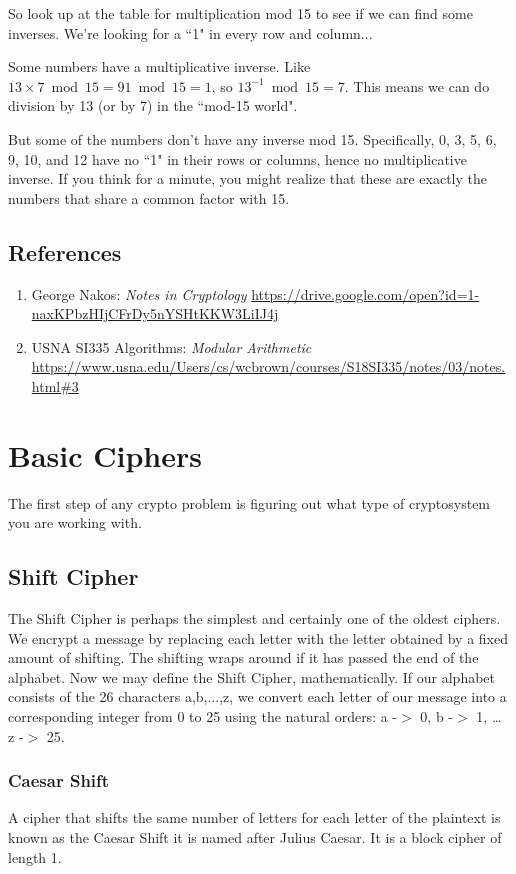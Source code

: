 \documentclass{report}
\begin{document}
So look up at the table for multiplication mod 15 to see if we can find some inverses. We're looking for a ``1" in every row and column...

Some numbers have a multiplicative inverse. Like \(13\times 7 \bmod 15= 91\bmod 15 = 1\), so \(13^{-1} \bmod 15 = 7\). This means we can do division by 13 (or by 7) in the ``mod-15 world".

But some of the numbers don't have any inverse mod 15. Specifically, 0, 3, 5, 6, 9, 10, and 12 have no ``1" in their rows or columns, hence no multiplicative inverse. If you think for a minute, you might realize that these are exactly the numbers that share a common factor with 15.

\vspace{1cm}
\section{References}
\label{ref:3}
\begin{enumerate}[label=(\alph*)]
\item George Nakos: \textit{Notes in Cryptology} \url{https://drive.google.com/open?id=1-naxKPbzHIjCFrDy5nYSHtKKW3LiIJ4j}
\item USNA SI335 Algorithms: \textit{Modular Arithmetic} \url{https://www.usna.edu/Users/cs/wcbrown/courses/S18SI335/notes/03/notes.html#3}
\end{enumerate}

\chapter{Basic Ciphers}
The first step of any crypto problem is figuring out what type of cryptosystem you are working with.
\section{Shift Cipher}
The \color{blue} Shift Cipher \color{black} is perhaps the simplest and certainly one of the oldest ciphers. We encrypt a message by replacing each letter with the letter obtained by a fixed amount of shifting. The shifting wraps around if it has passed the end of the alphabet.  
\newline
Now we may define the Shift Cipher, mathematically. If our alphabet consists of the 26 characters a,b,...,z, we convert each letter of our message into a corresponding integer from 0 to 25 using the natural orders: a -\(>\) 0, b -\(>\) 1, … z -\(>\) 25.  
\subsection{Caesar Shift}
A cipher that shifts the same number of letters for each letter of the plaintext is known as the \color{blue} Caesar Shift \color{black} it is named after Julius Caesar.  It is a block cipher of length 1.\newline \newline 
\end{document}
